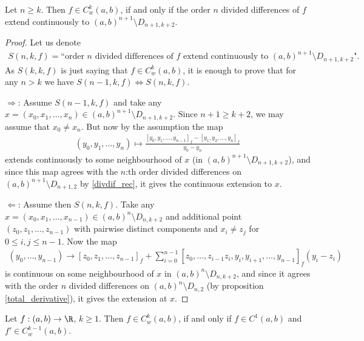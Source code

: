 \begin{lem}\label{weaklyCk_basic}
	Let $n \geq k$. Then $f \in C_{w}^{k}(a, b)$, if and only if the order $n$ divided differences of $f$ extend continuously to $(a, b)^{n + 1} \setminus D_{n + 1, k + 2}$.
\end{lem}
\begin{proof}
	Let us denote
	\begin{align*}
		S(n, k, f) = \text{``order $n$ divided differences of $f$ extend continuously to $(a, b)^{n + 1} \setminus D_{n + 1, k + 2}$"}.
	\end{align*}
	As $S(k, k, f)$ is just saying that $f \in C_{w}^{k}(a, b)$, it is enough to prove that for any $n > k$ we have $S(n - 1, k, f) \Leftrightarrow S(n, k, f)$.

	$\Rightarrow$: Assume $S(n - 1, k, f)$ and take any $x = (x_{0}, x_{1}, \ldots, x_{n}) \in (a, b)^{n + 1} \setminus D_{n + 1, k + 2}$. Since $n + 1 \geq k + 2$, we may assume that $x_{0} \neq x_{n}$. But now by the assumption the map
	\begin{align*}
		(y_{0}, y_{1}, \ldots, y_{n}) \mapsto \frac{[y_{0}, y_{1}, \ldots, y_{n - 1}]_{f} - [y_{1}, y_{2}, \ldots, y_{n}]_{f}}{y_{0} - y_{n}}
	\end{align*}
	extends continuously to some neighbourhood of $x$ (in $(a, b)^{n + 1} \setminus D_{n + 1, k + 2}$), and since this map agrees with the $n$:th order divided differences on $(a, b)^{n + 1} \setminus D_{n + 1, 2}$ by \ref{divdif_rec}, it gives the continuous extension to $x$.

	$\Leftarrow$: Assume then $S(n, k, f)$. Take any $x = (x_{0}, x_{1}, \ldots, x_{n - 1}) \in (a, b)^{n} \setminus D_{n, k + 2}$ and additional point $(z_{0}, z_{1}, \ldots, z_{n - 1})$ with pairwise distinct components and $x_{i} \neq z_{j}$ for $0 \leq i, j \leq n - 1$. Now the map
	\begin{align*}
		(y_{0}, \ldots, y_{n - 1}) \to [z_{0}, z_{1}, \ldots, z_{n - 1}]_{f} + \sum_{i = 0}^{n - 1}[z_{0}, \ldots, z_{i - 1} z_{i}, y_{i}, y_{i + 1}, \ldots, y_{n - 1}]_{f} (y_{i} - z_{i})
	\end{align*}
	is continuous on some neighbourhood of $x$ in $(a, b)^{n} \setminus D_{n, k + 2}$, and since it agrees with the order $n$ divided differences on $(a, b)^{n} \setminus D_{n, 2}$ (by proposition \ref{total_derivative}), it gives the extension at $x$.
\end{proof}

\begin{lem}\label{weaktoreal_lemma}
	Let $f : (a, b) \to \R$, $k \geq 1$. Then $f \in C_{w}^{k}(a, b)$, if and only if $f \in C^{1}(a, b)$ and $f' \in C_{w}^{k - 1}(a, b)$.
\end{lem}

